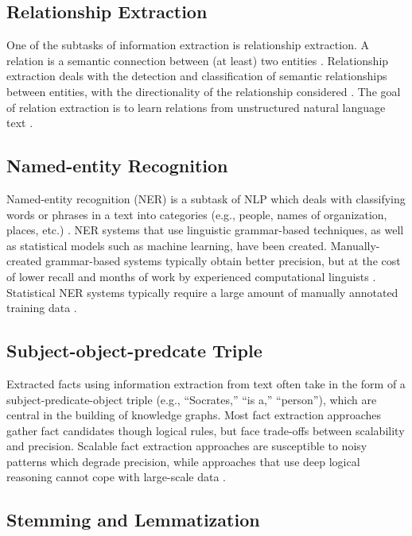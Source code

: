 \documentclass[10pt,11pt,12pt,oneside]{book}
\begin{document}
	\subsection{Relationship Extraction}
	One of the subtasks of information extraction is relationship extraction. A relation is a semantic connection between (at least) two entities \cite{orr_2013}. Relationship extraction deals with the detection and classification of semantic relationships between entities, with the directionality of the relationship considered \cite {chagoyen2006discovering}. The goal of relation extraction is to learn relations from unstructured natural language text \cite{orr_2013}.
	
	\subsection{Named-entity Recognition}
	    Named-entity recognition (NER) is a subtask of NLP which deals with classifying words or phrases in a text into categories (e.g., people, names of organization, places, etc.) \cite {nadeau2007survey}. NER systems that use linguistic grammar-based techniques, as well as statistical models such as machine learning, have been created. Manually-created grammar-based systems typically obtain better precision, but at the cost of lower recall and months of work by experienced computational linguists \cite {kapetanios2013natural}. Statistical NER systems typically require a large amount of manually annotated training data \cite {lin2009phrase}.
	
	\subsection{Subject-object-predcate Triple}
		Extracted facts using information extraction from text often take in the form of a subject-predicate-object triple (e.g., “Socrates,” “is a,” “person”), which are central in the building of knowledge graphs. Most fact extraction approaches gather fact candidates though logical rules, but face trade-offs between scalability and precision. Scalable fact extraction approaches are susceptible to noisy patterns which degrade precision, while approaches that use deep logical reasoning cannot cope with large-scale data \cite{nakashole2012automatic}.
		
	\subsection{Stemming and Lemmatization}
	
\end{document}
